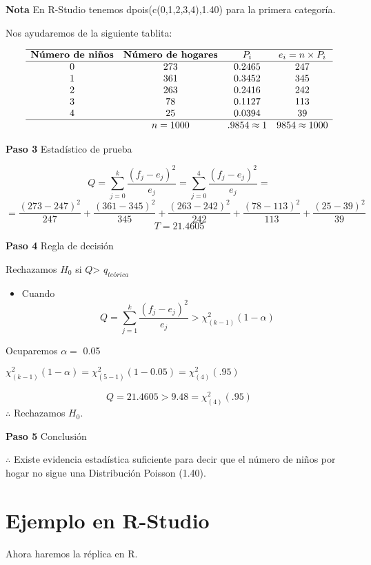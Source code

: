 \documentclass[
  a4paper,
  oneside,
  openany]{book}
\providecommand{\tightlist}{%
  \setlength{\itemsep}{0pt}\setlength{\parskip}{0pt}}
\begin{document}
\textbf{Nota} En R-Studio tenemos dpois(c(0,1,2,3,4),1.40) para la primera categoría.

Nos ayudaremos de la siguiente tablita:

\[
\begin{array}{c c c c c}
\hline
\textbf{Número de niños} & \textbf{Número de hogares} & P_{i} & e_i=n \times P_i \\
\hline
0&273&0.2465&247 \\
1&361&0.3452&345 \\
2&263&0.2416&242 \\
3&78&0.1127&113 \\
4&25&0.0394&39 \\
\hline
&n=1000&.9854\approx1 &9854\approx1000 \\
\end{array}
\]

\textbf{Paso 3} Estadístico de prueba

\[Q=\sum_{j=0}^{k}\frac{(f_{j}-e_{j})^2}{e_{j}}=\sum_{j=0}^{4}\frac{(f_{j}-e_{j})^2}{e_{j}}=\]
\[=\frac{(273-247)^2}{247}+\frac{(361-345)^2}{345}+\frac{(263-242)^2}{242}+\frac{(78-113)^2}{113}+\frac{(25-39)^2}{39}\]
\[T=21.4605\]

\textbf{Paso 4} Regla de decisión

Rechazamos \(H_0\) si \(Q\)\textgreater{} \(q_{teórica}\)

\begin{itemize}
\tightlist
\item
  Cuando \[Q= \sum_{j=1}^{k}\frac{(f_{j}-e_{j})^2}{e_{j}} > \chi^2_{(k-1)}(1-\alpha)\]
\end{itemize}

Ocuparemos \(\alpha=\) 0.05

\(\chi^2_{(k-1)}(1-\alpha)=\chi^2_{(5-1)}(1-0.05) =\chi^2_{(4)}(.95)\)

\[ Q=21.4605 > 9.48= \chi^2_{(4)}(.95)\]
\(\therefore\) Rechazamos \(H_0\).

\textbf{Paso 5} Conclusión

\(\therefore\) Existe evidencia estadística suficiente para decir que el número de niños por hogar no sigue una Distribución Poisson (1.40).

\hypertarget{ejemplo-en-r-studio-13}{%
\section{Ejemplo en R-Studio}\label{ejemplo-en-r-studio-13}}

Ahora haremos la réplica en R.
\end{document}
